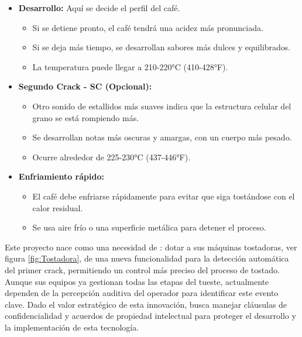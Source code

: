 \documentclass[
11pt, %
]{charter}
\begin{document}
\begin{itemize}
	\item \textbf{Desarrollo:} Aquí se decide el perfil del café.
	
		\begin{itemize}
		
			\item Si se detiene pronto, el café tendrá una acidez más pronunciada.
			
			\item Si se deja más tiempo, se desarrollan sabores más dulces y equilibrados.
			
			\item La temperatura puede llegar a 210-220°C (410-428°F).
		
		\end{itemize}
	
	\item \textbf{Segundo Crack - SC (Opcional):}
	
		\begin{itemize}
		
			\item Otro sonido de estallidos más suaves indica que la estructura celular del 				grano se está rompiendo más.
			
			\item Se desarrollan notas más oscuras y amargas, con un cuerpo más pesado.
			
			\item Ocurre alrededor de 225-230°C (437-446°F).
		
		\end{itemize}
	
	\item \textbf{Enfriamiento rápido:}
	
		\begin{itemize}
		
			\item El café debe enfriarse rápidamente para evitar que siga tostándose con el 				calor residual.
			
			\item Se usa aire frío o una superficie metálica para detener el proceso.
		
		\end{itemize}
	
\end{itemize}

Este proyecto nace como una necesidad de \empclientename: dotar a sus máquinas tostadoras, ver figura \ref{fig:Tostadora}, de una nueva funcionalidad para la detección automática del primer crack, permitiendo un control más preciso del proceso de tostado. Aunque sus equipos ya gestionan todas las etapas del tueste, actualmente dependen de la percepción auditiva del operador para identificar este evento clave. Dado el valor estratégico de esta innovación, \empclientename busca manejar cláusulas de confidencialidad y acuerdos de propiedad intelectual para proteger el desarrollo y la implementación de esta tecnología.
\end{document}
